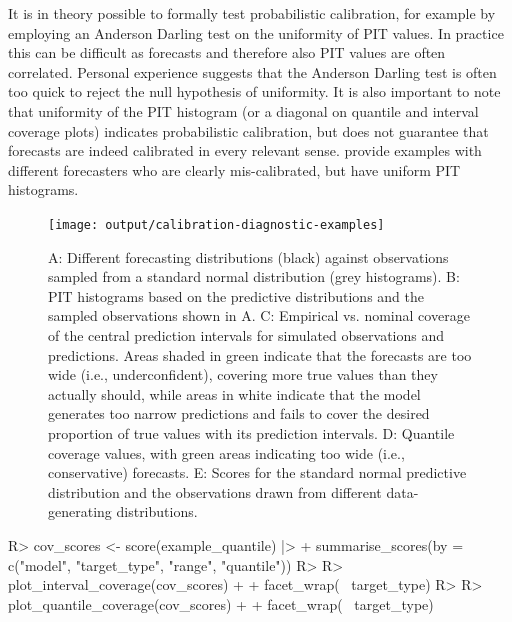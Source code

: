 \documentclass[
]{jss}
\begin{document}
It is in theory possible to formally test probabilistic calibration, for
example by employing an Anderson Darling test on the uniformity of PIT
values. In practice this can be difficult as forecasts and therefore
also PIT values are often correlated. Personal experience suggests that
the Anderson Darling test is often too quick to reject the null
hypothesis of uniformity. It is also important to note that uniformity
of the PIT histogram (or a diagonal on quantile and interval coverage
plots) indicates probabilistic calibration, but does not guarantee that
forecasts are indeed calibrated in every relevant sense.
\cite{gneitingProbabilisticForecastsCalibration2007, hamillInterpretationRankHistograms2001a}
provide examples with different forecasters who are clearly
mis-calibrated, but have uniform PIT histograms.

\begin{CodeChunk}
\begin{figure}[!h]

{\centering \texttt{[image: output/calibration-diagnostic-examples]} 

}

\caption[A]{A: Different forecasting distributions (black) against observations sampled from a standard normal distribution (grey histograms). B: PIT histograms based on the predictive distributions and the sampled observations shown in A. C: Empirical vs. nominal coverage of the central prediction intervals for simulated observations and predictions. Areas shaded in green indicate that the forecasts are too wide (i.e., underconfident), covering more true values than they actually should, while areas in white indicate that the model generates too narrow predictions and fails to cover the desired proportion of true values with its prediction intervals. D: Quantile coverage values, with green areas indicating too wide (i.e., conservative) forecasts. E: Scores for the standard normal predictive distribution and the observations drawn from different data-generating distributions.}\label{fig:calibration-plots}
\end{figure}
\end{CodeChunk}

\begin{CodeChunk}
\begin{CodeInput}
R> cov_scores <- score(example_quantile) |>
+   summarise_scores(by = c("model", "target_type", "range", "quantile"))
R> 
R> plot_interval_coverage(cov_scores) + 
+   facet_wrap(~ target_type)
R> 
R> plot_quantile_coverage(cov_scores) + 
+   facet_wrap(~ target_type)
\end{CodeInput}
\end{CodeChunk}
\end{document}
